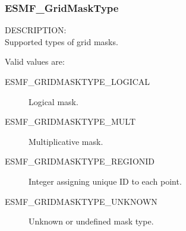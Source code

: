 \subsubsection{ESMF\_GridMaskType}

{\sf DESCRIPTION:\\}
Supported types of grid masks.

Valid values are:
\begin{description}
   \item [ESMF\_GRIDMASKTYPE\_LOGICAL]
         Logical mask.
   \item [ESMF\_GRIDMASKTYPE\_MULT]
         Multiplicative mask.
   \item [ESMF\_GRIDMASKTYPE\_REGIONID]
         Integer assigning unique ID to each point.
   \item [ESMF\_GRIDMASKTYPE\_UNKNOWN]
         Unknown or undefined mask type.
\end{description}
